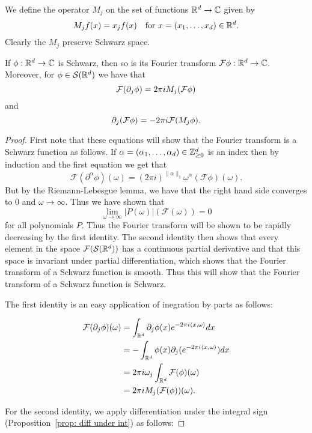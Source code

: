 \documentclass[twoside, a4paper, 10pt]{amsart}
\begin{document}
We define the operator $M_j$ on the set of functions $\mathbb{R}^d \to \mathbb{C}$ given by $$M_jf (x) = x_j f(x) \quad\text{for } x=(x_1, \ldots, x_d) \in \mathbb{R}^d.$$ Clearly the $M_j$ preserve Schwarz space.

\begin{thm} If $\phi:\mathbb{R}^d \to \mathbb{C}$ is Schwarz, then so is its Fourier transform $\mathcal{F}\phi:\mathbb{R}^d \to \mathbb{C}$. Moreover, for $\phi \in \mathcal{S}(\mathbb{R}^d)$ we have that $$ \mathcal{F}(\partial_j \phi) = 2\pi i M_j (\mathcal{F} \phi) $$ and $$\partial_j (\mathcal{F} \phi) = -2\pi i \mathcal{F}(M_j \phi).$$

\end{thm}

\begin{proof} First note that these equations will show that the Fourier transform is a Schwarz function as follows. If $\alpha = (\alpha_1, \ldots, \alpha_d) \in \mathbb{Z}_{\geq 0}^d$ is an index then by induction and the first equation we get that $$\mathcal{F}(\partial^{\alpha}\phi)(\omega) = (2\pi i)^{\|\alpha\|_1} \omega^{\alpha} (\mathcal{F}\phi)(\omega).$$ But by the Riemann-Lebesgue lemma, we have that the right hand side converges to $0$ and $\omega \to \infty$. Thus we have shown that $$\lim_{\omega \to \infty} |P(\omega)| (\mathcal{F}(\omega)) = 0$$ for all polynomials $P$. Thus the Fourier transform will be shown to be rapidly decreasing by the first identity. The second identity then shows that every element in the space $\mathcal{F}(\mathcal{S}(\mathbb{R}^d))$ has a continuous partial derivative and that this space is invariant under partial differentiation, which shows that the Fourier transform of a Schwarz function is smooth. Thus this will show that the Fourier transform of a Schwarz function is Schwarz.

The first identity is an easy application of inegration by parts as follows:

\begin{align*} \mathcal{F}(\partial_j \phi) (\omega) &= \int_{\mathbb{R}^d} \partial_j\phi(x) e^{-2\pi i \langle x, \omega \rangle} dx 
\\ &= -\int_{\mathbb{R}^d} \phi(x) \partial_j (e^{-2\pi i \langle x, \omega \rangle}) dx
\\ &= 2\pi i \omega_j \int_{\mathbb{R}^d} \mathcal{F}(\phi) (\omega)
\\& = 2\pi i M_j (\mathcal{F}(\phi)) (\omega).\end{align*}

For the second identity, we apply differentiation under the integral sign (Proposition~\ref{prop: diff under int}) as follows:


\end{proof}
\end{document}
